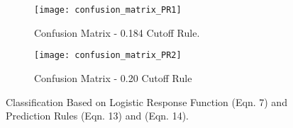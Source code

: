 \begin{figure}[H]
\centering
\begin{subfigure}{.5\textwidth}
  \centering
  \texttt{[image: confusion\_matrix\_PR1]}
  \caption{Confusion Matrix - 0.184 Cutoff Rule.}
  \label{fig:sub1}
\end{subfigure}%
\begin{subfigure}{.5\textwidth}
  \centering
  \texttt{[image: confusion\_matrix\_PR2]}
  \caption{Confusion Matrix - 0.20 Cutoff Rule}
  \label{fig:sub2}
\end{subfigure}
\caption{Classification Based on Logistic Response Function (Eqn. 7) and Prediction Rules (Eqn. 13) and (Eqn. 14).}
\label{fig:test}
\end{figure}